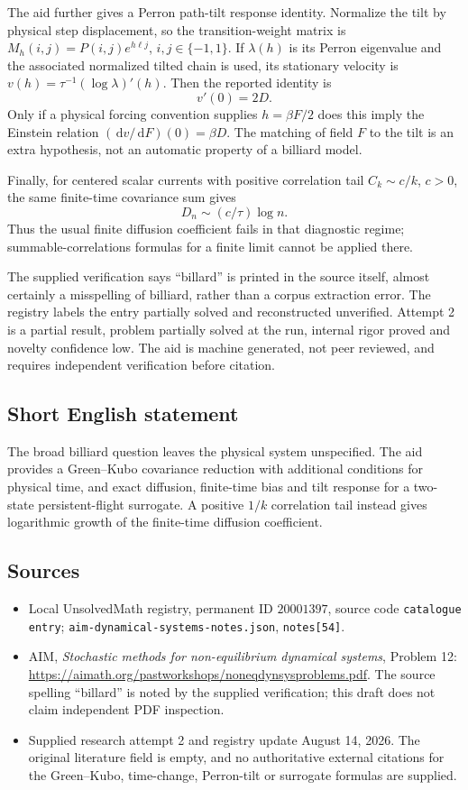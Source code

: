 \documentclass[11pt]{article}
\newcommand{\dd}{\,\mathrm{d}}
\begin{document}
The aid further gives a Perron path-tilt response identity. Normalize the tilt by physical step displacement, so the transition-weight matrix is \(M_h(i,j)=P(i,j)e^{h\ell j}\), \(i,j\in\{-1,1\}\). If \(\lambda(h)\) is its Perron eigenvalue and the associated normalized tilted chain is used, its stationary velocity is \(v(h)=\tau^{-1}(\log\lambda)'(h)\). Then the reported identity is
\[
v'(0)=2D.
\]
Only if a physical forcing convention supplies \(h=\beta F/2\) does this imply the Einstein relation \((\dd v/\dd F)(0)=\beta D\). The matching of field \(F\) to the tilt is an extra hypothesis, not an automatic property of a billiard model.

Finally, for centered scalar currents with positive correlation tail \(C_k\sim c/k\), \(c>0\), the same finite-time covariance sum gives
\[
D_n\sim(c/\tau)\log n.
\]
Thus the usual finite diffusion coefficient fails in that diagnostic regime; summable-correlations formulas for a finite limit cannot be applied there.

The supplied verification says ``billard'' is printed in the source itself, almost certainly a misspelling of billiard, rather than a corpus extraction error. The registry labels the entry partially solved and reconstructed unverified. Attempt 2 is a partial result, problem partially solved at the run, internal rigor proved and novelty confidence low. The aid is machine generated, not peer reviewed, and requires independent verification before citation.
\subsection{Short English statement}
The broad billiard question leaves the physical system unspecified. The aid provides a Green--Kubo covariance reduction with additional conditions for physical time, and exact diffusion, finite-time bias and tilt response for a two-state persistent-flight surrogate. A positive \(1/k\) correlation tail instead gives logarithmic growth of the finite-time diffusion coefficient.
\subsection{Sources}
\begin{itemize}
\item Local UnsolvedMath registry, permanent ID \(20001397\), source code \texttt{catalogue entry}; \texttt{aim-dynamical-systems-notes.json}, \texttt{notes[54]}.
\item AIM, \emph{Stochastic methods for non-equilibrium dynamical systems}, Problem 12: \url{https://aimath.org/pastworkshops/noneqdynsysproblems.pdf}. The source spelling ``billard'' is noted by the supplied verification; this draft does not claim independent PDF inspection.
\item Supplied research attempt 2 and registry update August 14, 2026. The original literature field is empty, and no authoritative external citations for the Green--Kubo, time-change, Perron-tilt or surrogate formulas are supplied.
\end{itemize}
\end{document}
